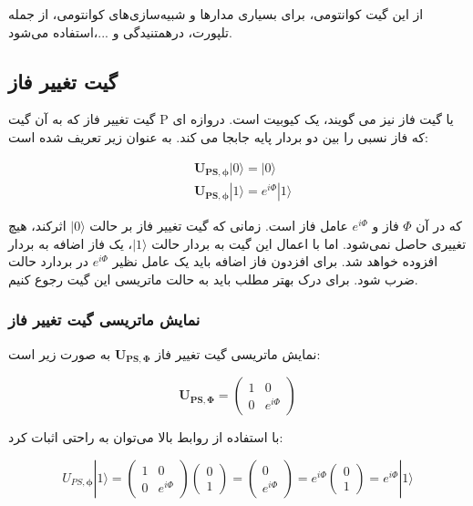 \documentclass{book}
\begin{document}
از این گیت کوانتومی‌، برای بسیاری مدار‌ها و شبیه‌سازی‌های کوانتومی، از جمله تلپورت، درهمتنیدگی و ...،استفاده می‌شود.

\subsection*{گیت تغییر فاز}
گیت تغییر فاز که به آن گیت P یا گیت فاز نیز می گویند، یک کیوبیت است.
دروازه ای که فاز نسبی را بین دو بردار پایه جابجا می کند. به عنوان زیر تعریف شده است:
\begin{center}
	$$\begin{aligned}
		& \boldsymbol{U}_{\boldsymbol{PS}, \boldsymbol{\phi}}|0\rangle=|0\rangle \\
		& \boldsymbol{U}_{\boldsymbol{PS},  \boldsymbol{\phi}}|1\rangle=e^{i \Phi}|1\rangle
	\end{aligned}$$
\end{center}


که در آن $\Phi$ فاز و $e^{i\Phi}$ عامل فاز است. 
زمانی که گیت تغییر فاز بر حالت $\vert 0 \rangle$  اثرکند، هیچ تغییری حاصل نمی‌شود. اما با اعمال این گیت به بردار حالت $\vert 1 \rangle$، یک فاز اضافه به بردار افزوده خواهد شد. برای افزدون فاز اضافه  باید یک عامل نظیر  $e^{i\Phi}$ در بردارد حالت ضرب شود. برای درک بهتر مطلب باید به حالت ماتریسی این گیت رجوع کنیم.





\subsubsection{نمایش ماتریسی گیت تغییر فاز}

نمایش ماتریسی گیت تغییر فاز $\boldsymbol{U}_{\boldsymbol{P} \boldsymbol{S}, \boldsymbol{\Phi}}$ به صورت زیر است:

\begin{center}
	$$\boldsymbol{U}_{\boldsymbol{P} \boldsymbol{S}, \boldsymbol{\Phi}}=\left(\begin{array}{cc}
		1 & 0 \\
		0 & e^{i \Phi}
	\end{array}\right)$$
\end{center}
با استفاده از روابط بالا می‌توان  به راحتی اثبات کرد: 
\begin{center}
	$$U_{P S, \boldsymbol{\phi}}|1\rangle=\left(\begin{array}{cc}
		1 & 0 \\
		0 & e^{i \Phi}
	\end{array}\right)\left(\begin{array}{l}
		0 \\
		1
	\end{array}\right)=\left(\begin{array}{c}
		0 \\
		e^{i \Phi}
	\end{array}\right)=e^{i \Phi}\left(\begin{array}{l}
		0 \\
		1
	\end{array}\right)=e^{i \Phi}|1\rangle$$
\end{center}
\end{document}
